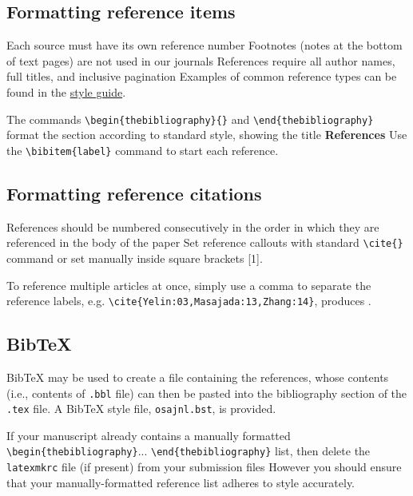 \documentclass{osa-article}
\begin{document}
\subsection{Formatting reference items}
Each source must have its own reference number
Footnotes (notes at the bottom of text pages) are not used in our journals
References require all author names, full titles, and inclusive pagination
Examples of common reference types can be found in the  \href{https://www.osapublishing.org/submit/style/osa-styleguide.cfm} {style guide}.


The commands \verb+\begin{thebibliography}{}+ and \verb+\end{thebibliography}+ format the section according to standard style, showing the title {\bfseries References}
Use the \verb+\bibitem{label}+ command to start each reference.

\subsection{Formatting reference citations}
References should be numbered consecutively in the order in which they are referenced in the body of the paper
Set reference callouts with standard \verb+\cite{}+ command or set manually inside square brackets [1].

To reference multiple articles at once, simply use a comma to separate the reference labels, e.g. \verb+\cite{Yelin:03,Masajada:13,Zhang:14}+, produces \cite{Yelin:03,Masajada:13,Zhang:14}.

\subsection{Bib\TeX}
\label{sec:bibtex}
Bib\TeX{} may be used to create a file containing the references, whose contents (i.e., contents of \texttt{.bbl} file) can then be pasted into the bibliography section of the \texttt{.tex} file. A Bib\TeX{} style file, \texttt{osajnl.bst}, is provided.

If your manuscript already contains a manually formatted \verb|\begin{thebibliography}|... \verb|\end{thebibliography}| list, then delete the \texttt{latexmkrc} file (if present) from your submission files
However you should ensure that your manually-formatted reference list adheres to style accurately.
\end{document}
